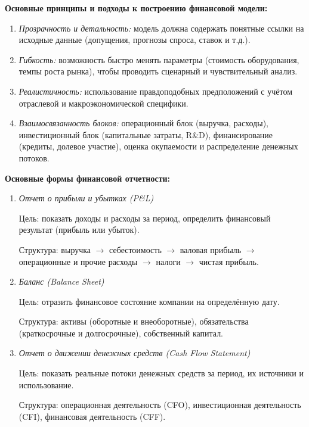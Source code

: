 \textbf{Основные принципы и подходы к построению финансовой модели:}
\begin{enumerate}
    \item \textit{Прозрачность и детальность:} модель должна содержать понятные ссылки на исходные данные (допущения, прогнозы спроса, ставок и т.д.).
    \item \textit{Гибкость:} возможность быстро менять параметры (стоимость оборудования, темпы роста рынка), чтобы проводить сценарный и чувствительный анализ.
    \item \textit{Реалистичность:} использование правдоподобных предположений с учётом отраслевой и макроэкономической специфики.
    \item \textit{Взаимосвязанность блоков:} операционный блок (выручка, расходы), инвестиционный блок (капитальные затраты, R\&D), финансирование (кредиты, долевое участие), оценка окупаемости и распределение денежных потоков.
\end{enumerate}

\textbf{Основные формы финансовой отчетности:}
\begin{enumerate}
    \item \textit{Отчет о прибыли и убытках (P\&L)}
    
    Цель: показать доходы и расходы за период, определить финансовый результат (прибыль или убыток).
    
    Структура: выручка $\rightarrow$ себестоимость $\rightarrow$ валовая прибыль $\rightarrow$ операционные и прочие расходы $\rightarrow$ налоги $\rightarrow$ чистая прибыль.

    \item \textit{Баланс (Balance Sheet)}

    Цель: отразить финансовое состояние компании на определённую дату.
    
    Структура: активы (оборотные и внеоборотные), обязательства (краткосрочные и долгосрочные), собственный капитал.

    \item \textit{Отчет о движении денежных средств (Cash Flow Statement)}
    
    Цель: показать реальные потоки денежных средств за период, их источники и использование.
    
    Структура: операционная деятельность (CFO), инвестиционная деятельность (CFI), финансовая деятельность (CFF).
    
\end{enumerate}

